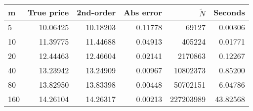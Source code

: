 \begin{tabular}{lrrrrr}
\toprule
m & True price & 2nd-order & Abs error & $\tilde{N}$ &   Seconds \\
\midrule
5   &   10.06425 &  10.18203 &   0.11778 &       69127 &   0.00306 \\
10  &   11.39775 &  11.44688 &   0.04913 &      405224 &   0.01771 \\
20  &   12.44463 &  12.46604 &   0.02141 &     2170863 &   0.12267 \\
40  &   13.23942 &  13.24909 &   0.00967 &    10802373 &   0.85200 \\
80  &   13.82950 &  13.83398 &   0.00448 &    50702151 &   6.04786 \\
160 &   14.26104 &  14.26317 &   0.00213 &   227203989 &  43.82568 \\
\bottomrule
\end{tabular}
